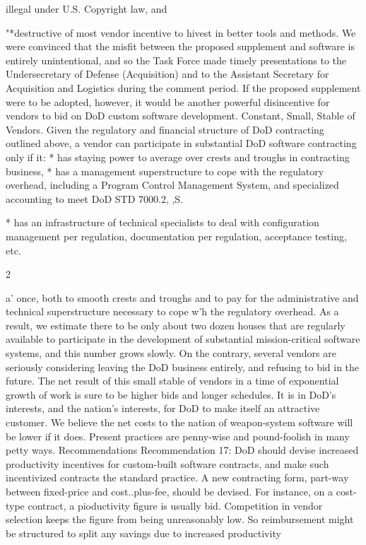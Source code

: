 \documentclass[12pt]{article}
\begin{document}

illegal under U.S. Copyright law, and

"*destructive of most vendor incentive to hivest in better tools and methods.
We were convinced that the misfit between the proposed supplement and software is
entirely unintentional, and so the Task Force made timely presentations to the Undersecretary of Defense (Acquisition) and to the Assistant Secretary for Acquisition and Logistics
during the comment period. If the proposed supplement were to be adopted, however,
it would be another powerful disincentive for vendors to bid on DoD custom software
development.
Constant, Small, Stable of Vendors. Given the regulatory and financial structure
of DoD contracting outlined above, a vendor can participate in substantial DoD software
contracting only if it:
* has staying power to average over crests and troughs in contracting business,
* has a management superstructure to cope with the regulatory overhead, including
a Program Control Management System, and specialized accounting to meet DoD
STD 7000.2,
,S.

* has an infrastructure of technical specialists to deal with configuration management
per regulation, documentation per regulation, acceptance testing, etc.

2

a' once, both to smooth crests and troughs and to pay for the administrative and
technical superstructure necessary to cope w'h the regulatory overhead.
As a result, we estimate there to be only about two dozen houses that are regularly
available to participate in the development of substantial mission-critical software systems,
and this number grows slowly. On the contrary, several vendors are seriously considering
leaving the DoD business entirely, and refusing to bid in the future.
The net result of this small stable of vendors in a time of exponential growth of work
is sure to be higher bids and longer schedules. It is in DoD's interests, and the nation's
interests, for DoD to make itself an attractive customer. We believe the net costs to the
nation of weapon-system software will be lower if it does. Present practices are penny-wise
and pound-foolish in many petty ways.
Recommendations
Recommendation 17: DoD should devise increased productivity incentives
for custom-built software contracts, and make such incentivized contracts the
standard practice.
A new contracting form, part-way between fixed-price and cost..plus-fee, should be
devised. For instance, on a cost-type contract, a pioductivity figure is usually bid.
Competition in vendor selection keeps the figure from being unreasonably low. So
reimbursement might be structured to split any savings due to increased productivity
\end{document}
